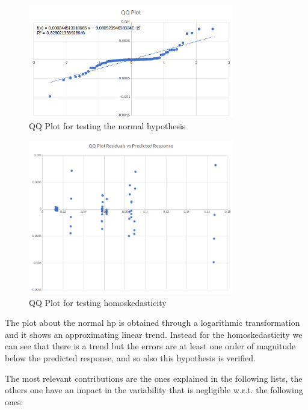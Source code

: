 \begin{figure}[H]
	\centering
	\includegraphics[width=0.8\textwidth]{img/qqplot_2kr_responsetime.png}
	\caption{QQ Plot for testing the normal hypothesis}
	\label {img: qqplot_responsetime}
\end{figure}

\begin{figure}[H]
	\centering
	\includegraphics[width=0.8\textwidth]{img/homoskedasticity_2kr_responsetime.png}
	\caption{QQ Plot for testing homoskedasticity}
	\label {img: homoskedasticity_responsetime}
\end{figure}

\noindent The plot about the normal hp is obtained through a logarithmic transformation and it shows an approximating linear trend. Instead for the homoskedasticity we can see that there is a trend but the errors are at least one order of magnitude below the predicted response, and so also this hypothesis is verified.

\noindent The most relevant contributions are the ones explained in the following lists, the others one have an impact in the variability that is negligible w.r.t. the following ones: 

